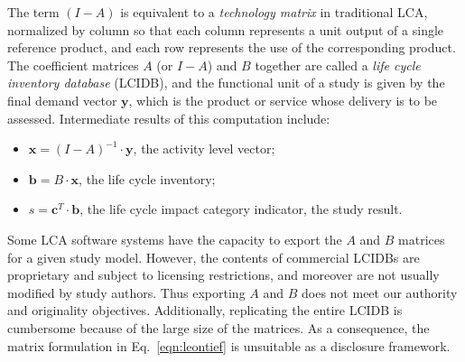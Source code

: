The term $(I-A)$ is equivalent to a \textit{technology matrix} in traditional LCA, normalized by column so that each column represents a unit output of a single reference product, and each row represents the use of the corresponding product. 
The coefficient matrices $A$ (or $I-A$) and $B$ together are called a \textit{life cycle inventory database} (LCIDB), and the functional unit of a study is given by the final demand vector $\mathbf{y}$, which is the product or service whose delivery is to be assessed.
Intermediate results of this computation include:
\begin{itemize}
\item $\mathbf{x} = \left(I-A\right)^{-1}\cdot\mathbf{y}$, the activity level vector;
\item $\mathbf{b} = B\cdot\mathbf{x}$, the life cycle inventory;
\item $s = \mathbf{c}^T\cdot\mathbf{b}$, the life cycle impact category indicator, the study result.
\end{itemize}

Some LCA software systems have the capacity to export the $A$ and $B$ matrices for a given study model.  However, the contents of commercial LCIDBs are proprietary and subject to licensing restrictions, and moreover are not usually modified by study authors.  Thus exporting $A$ and $B$ does not meet our authority and originality objectives.  Additionally, replicating the entire LCIDB is cumbersome because of the large size of the matrices.   As a consequence, the matrix formulation in Eq.~\ref{eqn:leontief} is unsuitable as a disclosure framework.
